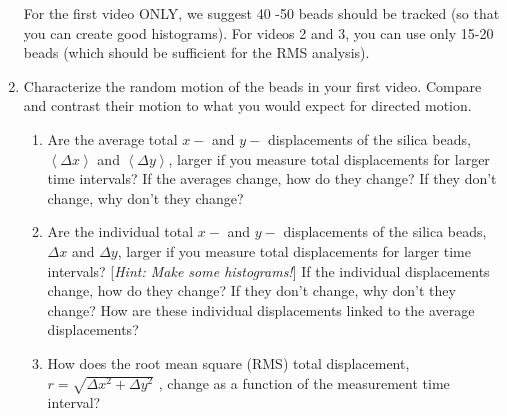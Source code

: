 \begin{enumerate}
For the first video ONLY, we suggest 40 -50 beads should be tracked (so that you can create good histograms). 
For videos 2 and 3, you can use only 15-20 beads (which should be sufficient for the RMS analysis).
\item Characterize the random motion of the beads in your first video. Compare and contrast their motion to what you would expect for directed motion.
\begin{enumerate}
\item Are the average total $x-$ and $y-$ displacements of the silica beads, $\left \langle \Delta x \right \rangle$ and $\left \langle \Delta y \right \rangle$, larger if you measure total displacements for larger time intervals? If the averages change, how do they change? If they don't change, why don't they change?
\item Are the individual total $x-$ and $y-$ displacements of the silica beads, $\Delta x$ and $\Delta y$, larger if you measure total displacements for larger time intervals? [\textit{Hint: Make some histograms!}] If the individual displacements change, how do they change? If they don't change, why don't they change? How are these individual displacements linked to the average displacements?
\item How does the root mean square (RMS) total displacement, $r=\sqrt{\Delta x^2+\Delta y^2}$ , change as a function of the measurement time interval?
\end{enumerate}
\end{enumerate}

